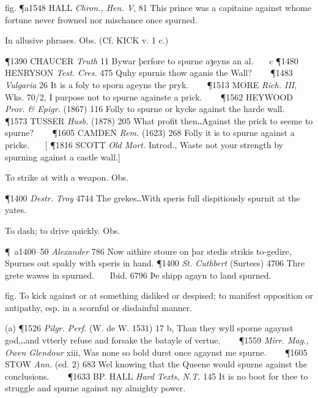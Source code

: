 \begin{description}[wide, labelwidth=!, labelindent=0pt]
\begin{myenumerate}
fig. \P a1548 HALL  \textit{Chron., Hen. V}, 81 This prince was a capitaine against whome fortune never frowned nor mischance once spurned.

 In allusive phrases. Obs. (Cf. KICK v. 1 c.)

\P 1390 CHAUCER  \textit{Truth} 11 Bywar þerfore to spurne aȝeyns an al.    c 
\P 1480 HENRYSON  \textit{Test. Cres.} 475 Quhy spurnis thow aganis the Wall?    
\P 1483 \textit{Vulgaria}  26 It is a foly to sporn ageyns the pryk.    
\P 1513 MORE  \textit{Rich. III}, Wks. 70/2, I purpose not to spurne againste a prick.    
\P 1562 HEYWOOD  \textit{Prov. \& Epigr.} (1867) 116 Folly to spurne or kycke against the harde wall.    
\P 1573 TUSSER  \textit{Husb.} (1878) 205 What profit then‥Against the prick to seeme to spurne?    
\P 1605 CAMDEN  \textit{Rem.} (1623) 268 Folly it is to spurne against a pricke.    [
\P 1816 SCOTT  \textit{Old Mort.} Introd., Waste not your strength by spurning against a castle wall.]

 To strike at with a weapon. Obs.

\P 1400  \textit{Destr. Troy} 4744 The grekes‥With speris full dispitiously spurnit at the yates.

 To dash; to drive quickly. Obs.

\P a1400–50 \textit{Alexander} 786 Now aithire stoure on þar stedis strikis to-gedire, Spurnes out spakly with speris in hand. 
\P 1400 \textit{St. Cuthbert}  (Surtees) 4706 Thre grete wawes in spurned.    Ibid. 6796 Þe shipp agayn to land spurned.

 fig. To kick against or at something disliked or despised; to manifest opposition or antipathy, esp. in a scornful or disdainful manner.

(a) \P 1526  \textit{Pilgr. Perf.} (W. de W. 1531) 17 b, Than they wyll sporne agaynst god,‥and vtterly refuse and forsake the batayle of vertue.    
\P 1559 \textit{Mirr.  Mag., Owen Glendour} xiii, Was none so bold durst once agaynst me spurne.    
\P 1605 STOW  \textit{Ann.} (ed. 2) 683 Wel knowing that the Queene would spurne against the conclusions.    
\P 1633 BP. HALL  \textit{Hard Texts, N.T.} 145 It is no boot for thee to struggle and spurne against my almighty power.


\end{myenumerate}
\end{description}
